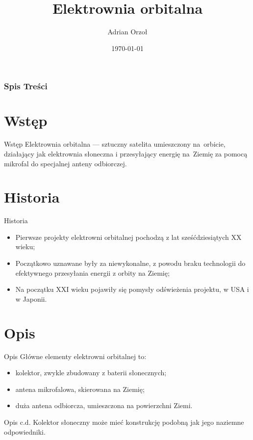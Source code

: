 \documentclass{beamer}
\title{Elektrownia orbitalna}
\author{Adrian Orzoł}
\institute{UWM}
\date{\today}
\begin{document}
\frame{\titlepage}



\begin{frame}
\frametitle{Spis Treści}
\tableofcontents
\end{frame}



\section{Wstęp}
\begin{frame}{Wstęp}
Elektrownia orbitalna --- sztuczny satelita umieszczony na~orbicie, działający jak elektrownia słoneczna i przesyłający energię na~Ziemię za pomocą mikrofal do specjalnej anteny odbiorczej.
\end{frame}

\section{Historia}
\begin{frame}{Historia}
\begin{itemize}
\item Pierwsze projekty elektrowni orbitalnej pochodzą z lat sześćdziesiątych XX wieku;
\pause
\item Początkowo uznawane były za niewykonalne, z powodu braku technologii do efektywnego przesyłania energii z orbity na Ziemię;
\pause
\item Na początku XXI wieku pojawiły się pomysły odświeżenia projektu, w USA i w Japonii.
\end{itemize}
\end{frame}
\section{Opis}
\begin{frame}{Opis}
Główne elementy elektrowni orbitalnej to:
\pause
\begin{itemize}
\item kolektor, zwykle zbudowany z baterii słonecznych;
\pause
\item antena mikrofalowa, skierowana na Ziemię;
\pause
\item duża antena odbiorcza, umieszczona na powierzchni Ziemi.
\end{itemize}
\end{frame}
\begin{frame}{Opis c.d.}
Kolektor słoneczny może mieć konstrukcję podobną jak jego naziemne odpowiedniki.
\end{frame}
\end{document}
